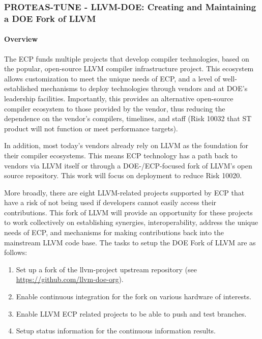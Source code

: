 \subsubsection{ PROTEAS-TUNE - LLVM-DOE: Creating and Maintaining a DOE Fork of LLVM}\label{s:llvm-doe}

\paragraph{Overview}

The ECP funds multiple projects that develop compiler technologies, based on the
popular, open-source LLVM compiler infrastructure project. This ecosystem allows
customization to meet the unique needs of ECP, and a level of well-established
mechanisms to deploy technologies through vendors and at DOE’s leadership
facilities. Importantly, this provides an alternative open-source compiler
ecosystem to those provided by the vendor, thus reducing the dependence on the
vendor’s compilers, timelines, and staff (Risk 10032 that ST product will not
function or meet performance targets).

In addition, most today’s vendors already rely on LLVM as the foundation for
their compiler ecosystems. This means ECP technology has a path back to vendors
via LLVM itself or through a DOE-/ECP-focused fork of LLVM’s open source
repository. This work will focus on deployment to reduce Risk 10020.

More broadly, there are eight LLVM-related projects supported by ECP that have
a risk of not being used if developers cannot easily access their contributions.
This fork of LLVM will provide an opportunity for these projects to work
collectively on establishing synergies, interoperability, address the unique
needs of ECP, and mechanisms for making contributions back into the mainstream
LLVM code base. The tasks to setup the DOE Fork of LLVM are as follows:

\begin{enumerate}

\item Set up a fork of the llvm-project upstream repository (see \url{https://github.com/llvm-doe-org}).

\item Enable continuous integration for the fork on various hardware of       interests.

\item Enable LLVM ECP related projects to be able to push and test branches.

\item Setup status information for the continuous information results.

\end{enumerate}


